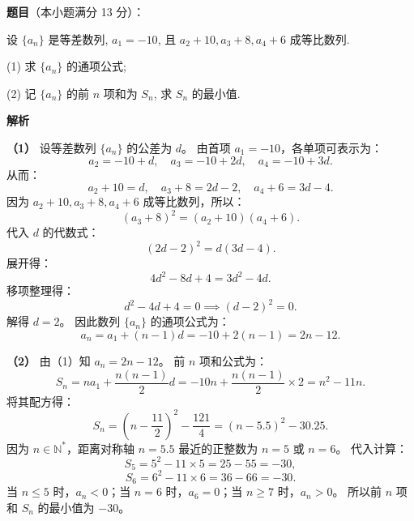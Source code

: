 \begin{answer}

\textbf{题目}（本小题满分 13 分）：

设 $\{a_n\}$ 是等差数列, $a_1 = -10$, 且 $a_2 + 10, a_3 + 8, a_4 + 6$ 成等比数列.

(1) 求 $\{a_n\}$ 的通项公式;

(2) 记 $\{a_n\}$ 的前 $n$ 项和为 $S_n$, 求 $S_n$ 的最小值.

\textbf{解析}

\textbf{（1）}
设等差数列 $\{a_n\}$ 的公差为 $d$。
由首项 $a_1 = -10$，各单项可表示为：
\nopagebreak[4]
\[a_2 = -10 + d, \quad a_3 = -10 + 2d, \quad a_4 = -10 + 3d.\]
从而：
\nopagebreak[4]
\[a_2 + 10 = d, \quad a_3 + 8 = 2d - 2, \quad a_4 + 6 = 3d - 4.\]
因为 $a_2 + 10, a_3 + 8, a_4 + 6$ 成等比数列，所以：
\nopagebreak[4]
\[(a_3 + 8)^2 = (a_2 + 10)(a_4 + 6).\]
代入 $d$ 的代数式：
\nopagebreak[4]
\[(2d - 2)^2 = d(3d - 4).\]
展开得：
\nopagebreak[4]
\[4d^2 - 8d + 4 = 3d^2 - 4d.\]
移项整理得：
\nopagebreak[4]
\[d^2 - 4d + 4 = 0 \implies (d - 2)^2 = 0.\]
解得 $d = 2$。
因此数列 $\{a_n\}$ 的通项公式为：
\nopagebreak[4]
\[a_n = a_1 + (n - 1)d = -10 + 2(n - 1) = 2n - 12.\]

\textbf{（2）}
由（1）知 $a_n = 2n - 12$。
前 $n$ 项和公式为：
\nopagebreak[4]
\[S_n = na_1 + \dfrac{n(n - 1)}{2}d = -10n + \dfrac{n(n - 1)}{2} \times 2 = n^2 - 11n.\]
将其配方得：
\nopagebreak[4]
\[S_n = \left(n - \dfrac{11}{2}\right)^2 - \dfrac{121}{4} = (n - 5.5)^2 - 30.25.\]
因为 $n \in \mathbb{N}^*$，距离对称轴 $n = 5.5$ 最近的正整数为 $n = 5$ 或 $n = 6$。
代入计算：
\nopagebreak[4]
\[S_5 = 5^2 - 11 \times 5 = 25 - 55 = -30,\]
\nopagebreak[4]
\[S_6 = 6^2 - 11 \times 6 = 36 - 66 = -30.\]
当 $n \leqslant 5$ 时，$a_n < 0$；当 $n = 6$ 时，$a_6 = 0$；当 $n \geqslant 7$ 时，$a_n > 0$。
所以前 $n$ 项和 $S_n$ 的最小值为 $-30$。



\end{answer}
